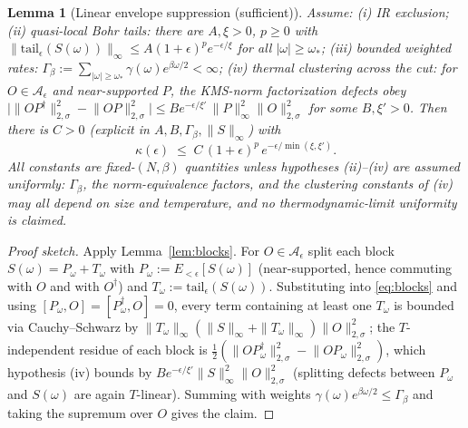 \documentclass[11pt,a4paper]{article}
\theoremstyle{plain}
\newtheorem{lemma}[theorem]{Lemma}
\theoremstyle{definition}
\theoremstyle{remark}
\newcommand{\eps}{\epsilon}
\newcommand{\normsig}[1]{\lVert #1 \rVert_{2,\sigma}}
\begin{document}
\begin{lemma}[Linear envelope suppression (sufficient)]\label{lem:envelope}
Assume: (i) IR exclusion; (ii) quasi-local Bohr tails: there are $A, \xi > 0$,
$p \ge 0$ with $\|\mathrm{tail}_\eps(S(\omega))\|_\infty \le
A(1+\eps)^p e^{-\eps/\xi}$ for all $|\omega| \ge \omega_*$; (iii) bounded
weighted rates: $\Gamma_\beta := \sum_{|\omega|\ge\omega_*}
\gamma(\omega)e^{\beta\omega/2} < \infty$; (iv) thermal clustering across the
cut: for $O \in \mathcal{A}_\eps$ and near-supported $P$, the KMS-norm
factorization defects obey
$\big|\normsig{OP^\dagger}^2 - \normsig{OP}^2\big| \le
B e^{-\eps/\xi'}\,\|P\|_\infty^2\normsig{O}^2$ for some $B, \xi' > 0$.
Then there is $C > 0$ (explicit in $A, B, \Gamma_\beta, \|S\|_\infty$) with
\begin{equation}
\kappa(\eps) \;\le\; C\,(1+\eps)^{p}\, e^{-\eps/\min(\xi, \xi')}.
\end{equation}
All constants are fixed-$(N, \beta)$ quantities unless hypotheses
(ii)--(iv) are assumed uniformly: $\Gamma_\beta$, the norm-equivalence
factors, and the clustering constants of (iv) may all depend on size and
temperature, and no thermodynamic-limit uniformity is claimed.
\end{lemma}

\begin{proof}[Proof sketch]
Apply Lemma~\ref{lem:blocks}. For $O \in \mathcal{A}_\eps$ split each block
$S(\omega) = P_\omega + T_\omega$ with $P_\omega := E_{<\eps}[S(\omega)]$
(near-supported, hence commuting with $O$ and with $O^\dagger$) and
$T_\omega := \mathrm{tail}_\eps(S(\omega))$. Substituting into
\eqref{eq:blocks} and using $[P_\omega, O] = [P_\omega^\dagger, O] = 0$, every
term containing at least one $T_\omega$ is bounded via Cauchy--Schwarz by
$\|T_\omega\|_\infty(\|S\|_\infty + \|T_\omega\|_\infty)\normsig{O}^2$; the
$T$-independent residue of each block is
$\tfrac12(\normsig{OP_\omega^\dagger}^2 - \normsig{OP_\omega}^2)$, which
hypothesis (iv) bounds by $Be^{-\eps/\xi'}\|S\|_\infty^2\normsig{O}^2$
(splitting defects between $P_\omega$ and $S(\omega)$ are again $T$-linear).
Summing with weights $\gamma(\omega)e^{\beta\omega/2} \le \Gamma_\beta$ and
taking the supremum over $O$ gives the claim.
\end{proof}
\end{document}
